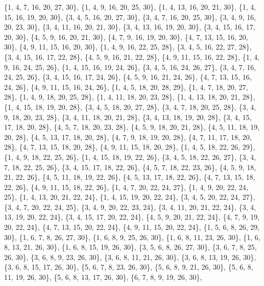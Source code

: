 \documentclass[11pt,a4paper]{article}
\begin{document}
{\{1, 4, 7, 16, 20, 27, 30\}, \{1, 4, 9, 16, 20, 25, 30\}, \{1, 4, 13, 16, 20, 21, 30\}, \{1, 4, 15, 16, 19, 20, 30\}, \{3, 4, 5, 16, 20, 27, 30\},
\{3, 4, 7, 16, 20, 25, 30\}, \{3, 4, 9, 16, 20, 23, 30\}, \{3, 4, 11, 16, 20, 21, 30\}, \{3, 4, 13, 16, 19, 20, 30\}, \{3, 4, 15, 16, 17, 20, 30\},
\{4, 5, 9, 16, 20, 21, 30\}, \{4, 7, 9, 16, 19, 20, 30\}, \{4, 7, 13, 15, 16, 20, 30\}, \{4, 9, 11, 15, 16, 20, 30\}, \{1, 4, 9, 16, 22, 25, 28\},
\{3, 4, 5, 16, 22, 27, 28\}, \{3, 4, 15, 16, 17, 22, 28\}, \{4, 5, 9, 16, 21, 22, 28\}, \{4, 9, 11, 15, 16, 22, 28\}, \{1, 4, 9, 16, 24, 25, 26\},
\{1, 4, 15, 16, 19, 24, 26\}, \{3, 4, 5, 16, 24, 26, 27\}, \{3, 4, 7, 16, 24, 25, 26\}, \{3, 4, 15, 16, 17, 24, 26\}, \{4, 5, 9, 16, 21, 24, 26\},
\{4, 7, 13, 15, 16, 24, 26\}, \{4, 9, 11, 15, 16, 24, 26\}, \{1, 4, 5, 18, 20, 28, 29\}, \{1, 4, 7, 18, 20, 27, 28\}, \{1, 4, 9, 18, 20, 25, 28\},
\{1, 4, 11, 18, 20, 23, 28\}, \{1, 4, 13, 18, 20, 21, 28\}, \{1, 4, 15, 18, 19, 20, 28\}, \{3, 4, 5, 18, 20, 27, 28\}, \{3, 4, 7, 18, 20, 25, 28\},
\{3, 4, 9, 18, 20, 23, 28\}, \{3, 4, 11, 18, 20, 21, 28\}, \{3, 4, 13, 18, 19, 20, 28\}, \{3, 4, 15, 17, 18, 20, 28\}, \{4, 5, 7, 18, 20, 23, 28\},
\{4, 5, 9, 18, 20, 21, 28\}, \{4, 5, 11, 18, 19, 20, 28\}, \{4, 5, 13, 17, 18, 20, 28\}, \{4, 7, 9, 18, 19, 20, 28\}, \{4, 7, 11, 17, 18, 20, 28\},
\{4, 7, 13, 15, 18, 20, 28\}, \{4, 9, 11, 15, 18, 20, 28\}, \{1, 4, 5, 18, 22, 26, 29\}, \{1, 4, 9, 18, 22, 25, 26\}, \{1, 4, 15, 18, 19, 22, 26\},
\{3, 4, 5, 18, 22, 26, 27\}, \{3, 4, 7, 18, 22, 25, 26\}, \{3, 4, 15, 17, 18, 22, 26\}, \{4, 5, 7, 18, 22, 23, 26\}, \{4, 5, 9, 18, 21, 22, 26\},
\{4, 5, 11, 18, 19, 22, 26\}, \{4, 5, 13, 17, 18, 22, 26\}, \{4, 7, 13, 15, 18, 22, 26\}, \{4, 9, 11, 15, 18, 22, 26\}, \{1, 4, 7, 20, 22, 24, 27\},
\{1, 4, 9, 20, 22, 24, 25\}, \{1, 4, 13, 20, 21, 22, 24\}, \{1, 4, 15, 19, 20, 22, 24\}, \{3, 4, 5, 20, 22, 24, 27\}, \{3, 4, 7, 20, 22, 24, 25\},
\{3, 4, 9, 20, 22, 23, 24\}, \{3, 4, 11, 20, 21, 22, 24\}, \{3, 4, 13, 19, 20, 22, 24\}, \{3, 4, 15, 17, 20, 22, 24\}, \{4, 5, 9, 20, 21, 22, 24\},
\{4, 7, 9, 19, 20, 22, 24\}, \{4, 7, 13, 15, 20, 22, 24\}, \{4, 9, 11, 15, 20, 22, 24\}, \{1, 5, 6, 8, 26, 29, 30\}, \{1, 6, 7, 8, 26, 27, 30\},
\{1, 6, 8, 9, 25, 26, 30\}, \{1, 6, 8, 11, 23, 26, 30\}, \{1, 6, 8, 13, 21, 26, 30\}, \{1, 6, 8, 15, 19, 26, 30\}, \{3, 5, 6, 8, 26, 27, 30\},
\{3, 6, 7, 8, 25, 26, 30\}, \{3, 6, 8, 9, 23, 26, 30\}, \{3, 6, 8, 11, 21, 26, 30\}, \{3, 6, 8, 13, 19, 26, 30\}, \{3, 6, 8, 15, 17, 26, 30\},
\{5, 6, 7, 8, 23, 26, 30\}, \{5, 6, 8, 9, 21, 26, 30\}, \{5, 6, 8, 11, 19, 26, 30\}, \{5, 6, 8, 13, 17, 26, 30\}, \{6, 7, 8, 9, 19, 26, 30\},
}
\end{document}
